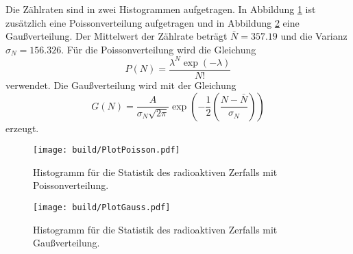 \noindent Die Zählraten sind in zwei Histogrammen aufgetragen.
In Abbildung \ref{fig:pos} ist zusätzlich eine Poissonverteilung aufgetragen und in Abbildung \ref{fig:gauß} eine Gaußverteilung.
Der Mittelwert der Zählrate beträgt $\bar{N}= \num{357.19}$ und die Varianz $\sigma_N = \num{156.326}$.
Für die Poissonverteilung wird die Gleichung
\begin{equation}
  P(N)=\frac{\lambda^N \exp(-\lambda)}{N!}
\end{equation}
verwendet.
Die Gaußverteilung wird mit der Gleichung
\begin{equation}
  G(N) = \frac{A}{\sigma_N \sqrt{2\pi}} \exp\left(-\frac{1}{2}\left(\frac{N-\bar{N}}{\sigma_N}\right)\right)
\end{equation}
erzeugt.
\begin{figure}[H]
  \centering
  \texttt{[image: build/PlotPoisson.pdf]}
  \caption{Histogramm für die Statistik des radioaktiven Zerfalls mit Poissonverteilung.}
  \label{fig:pos}
\end{figure}
\begin{figure}[H]
  \centering
  \texttt{[image: build/PlotGauss.pdf]}
  \caption{Histogramm für die Statistik des radioaktiven Zerfalls mit Gaußverteilung.}
  \label{fig:gauß}
\end{figure}
